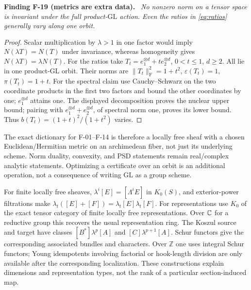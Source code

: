 \documentclass[11pt]{article}
\newcommand{\Z}{\mathbb Z}\newcommand{\Q}{\mathbb Q}
\newcommand{\HS}[1]{\lVert #1\rVert_{\mathrm F}}
\newcommand{\eps}{\varepsilon}
\newcommand{\GL}{\mathrm{GL}}\newcommand{\Sym}{\operatorname{Sym}}
\newenvironment{finding}[2]{\par\medskip\noindent\textbf{Finding #1 (#2).}\ \itshape}{\par\medskip}
\begin{document}
\begin{finding}{F-19}{metrics are extra data}
No nonzero norm on a tensor space is invariant under the full
product-$\GL$ action. Even the ratios in \eqref{eq:ratios}
generally vary along one orbit.
\end{finding}
\begin{proof}
Scalar multiplication by $\lambda>1$ in one factor would imply
$N(\lambda T)=N(T)$ under invariance, whereas homogeneity gives
$N(\lambda T)=\lambda N(T)$.
For the ratios take
$T_t=e_1^{\otimes d}+t e_2^{\otimes d}$, $0<t\leq1$, $d\geq2$.
All lie in one product-$\GL$ orbit. Their norms are
$\HS{T_t}^2=1+t^2$, $\eps(T_t)=1$, $\pi(T_t)=1+t$.
For the spectral claim use Cauchy--Schwarz on the two coordinate
products in the first two factors and bound the other coordinates
by one; $e_1^{\otimes d}$ attains one.
The displayed decomposition proves the nuclear upper bound;
pairing with $e_1^{\otimes d}+e_2^{\otimes d}$, of spectral norm
one, proves its lower bound. Thus $b(T_t)=(1+t)^2/(1+t^2)$ varies.
\end{proof}
The exact dictionary for F-01--F-14 is therefore a locally free
sheaf with a chosen Euclidean/Hermitian metric on an archimedean
fiber, not just its underlying scheme. Norm duality, convexity,
and PSD statements remain real/complex analytic statements.
Optimizing a certificate over an orbit is an additional operation,
not a consequence of writing $\GL$ as a group scheme.

For finite locally free sheaves,
$\lambda^i[E]=[\Lambda^iE]$ in $K_0(S)$, and exterior-power
filtrations make $\lambda_t([E]+[F])=\lambda_t[E]\lambda_t[F]$.
For representations use $K_0$ of the exact tensor category of
finite locally free representations. Over $\mathbb C$ for a reductive
group this recovers the usual representation ring.
The Koszul source and target have classes
$[B^*]\lambda^p[A]$ and $[C]\lambda^{p+1}[A]$.
Schur functors give the corresponding associated bundles and
characters. Over $\Z$ one uses integral Schur functors;
Young idempotents involving factorial or hook-length division
are only available after the corresponding localization.
These constructions explain dimensions and representation types,
not the rank of a particular section-induced map.
\end{document}
